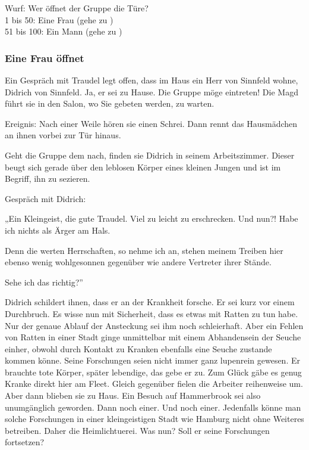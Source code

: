 
\begin{tcolorbox}
  Wurf: Wer öffnet der Gruppe die Türe? \\
  1 bis 50: Eine Frau (gehe zu \blue{\ref{frau öffnet}}) \\
  51 bis 100: Ein Mann (gehe zu \blue{\ref{sinnfeld öffnet}}) \\
\end{tcolorbox}

\subsubsection{Eine Frau öffnet}
\label{frau öffnet}

Ein Gespräch mit Traudel legt offen, dass im Haus ein Herr von Sinnfeld wohne, Didrich von Sinnfeld. Ja, er sei zu Hause. Die Gruppe möge eintreten! Die Magd führt sie in den Salon, wo Sie gebeten werden, zu warten. 

Ereignis: Nach einer Weile hören sie einen Schrei. Dann rennt das Hausmädchen an ihnen vorbei zur Tür hinaus.

Geht die Gruppe dem nach, finden sie Didrich in seinem Arbeitszimmer. Dieser beugt sich gerade über den leblosen Körper eines kleinen Jungen und ist im Begriff, ihn zu sezieren.

Gespräch mit Didrich:

„Ein Kleingeist, die gute Traudel. Viel zu leicht zu erschrecken. Und nun?! Habe ich nichts als Ärger am Hals.

Denn die werten Herrschaften, so nehme ich an, stehen meinem Treiben hier ebenso wenig wohlgesonnen gegenüber wie andere Vertreter ihrer Stände.

Sehe ich das richtig?”

Didrich schildert ihnen, dass er an der Krankheit forsche. Er sei kurz vor einem Durchbruch. Es wisse nun mit Sicherheit, dass es etwas mit Ratten zu tun habe. Nur der genaue Ablauf der Ansteckung sei ihm noch schleierhaft. Aber ein Fehlen von Ratten in einer Stadt ginge unmittelbar mit einem Abhandensein der Seuche einher, obwohl durch Kontakt zu Kranken ebenfalls eine Seuche zustande kommen könne. Seine Forschungen seien nicht immer ganz lupenrein gewesen. Er brauchte tote Körper, später lebendige, das gebe er zu. Zum Glück gäbe es genug Kranke direkt hier am Fleet. Gleich gegenüber fielen die Arbeiter reihenweise um. Aber dann blieben sie zu Haus. Ein Besuch auf Hammerbrook sei also unumgänglich geworden. Dann noch einer. Und noch einer. Jedenfalls könne man solche Forschungen in einer kleingeistigen Stadt wie Hamburg nicht ohne Weiteres betreiben. Daher die Heimlichtuerei. Was nun? Soll er seine Forschungen fortsetzen?

